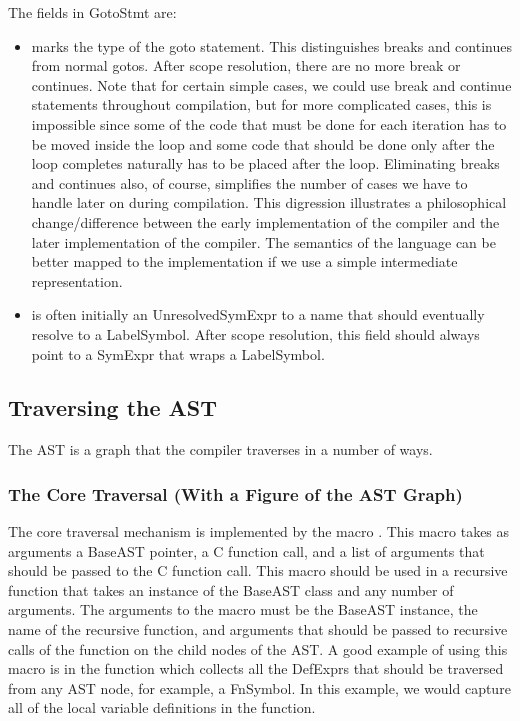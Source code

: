 \documentclass[10pt]{article}
\begin{document}
The fields in GotoStmt are:
\begin{itemize}
\item {} marks the type of the goto statement.  This
  distinguishes breaks and continues from normal gotos.  After scope
  resolution, there are no more break or continues.  Note that for
  certain simple cases, we could use break and continue statements
  throughout compilation, but for more complicated cases, this is
  impossible since some of the code that must be done for each
  iteration has to be moved inside the loop and some code that should
  be done only after the loop completes naturally has to be placed
  after the loop.  Eliminating breaks and continues also, of course,
  simplifies the number of cases we have to handle later on during
  compilation.  This digression illustrates a philosophical
  change/difference between the early implementation of the compiler
  and the later implementation of the compiler.  The semantics of the
  language can be better mapped to the implementation if we use a
  simple intermediate representation.
\item {} is often initially an UnresolvedSymExpr to a
  name that should eventually resolve to a LabelSymbol.  After scope
  resolution, this field should always point to a SymExpr that wraps a
  LabelSymbol.
\end{itemize}

\subsection{Traversing the AST}
\label{sec:traverse}

The AST is a graph that the compiler traverses in a number of ways.

\subsubsection{The Core Traversal (With a Figure of the AST Graph)}

The core traversal mechanism is implemented by the macro
.  This macro takes as arguments a BaseAST
pointer, a C function call, and a list of arguments that should be
passed to the C function call.  This macro should be used in a
recursive function that takes an instance of the BaseAST class and any
number of arguments.  The arguments to the macro must be the BaseAST
instance, the name of the recursive function, and arguments that
should be passed to recursive calls of the function on the child nodes
of the AST.  A good example of using this macro is in the function
 which collects all the DefExprs that should be
traversed from any AST node, for example, a FnSymbol.  In this
example, we would capture all of the local variable definitions in the
function.
\end{document}
